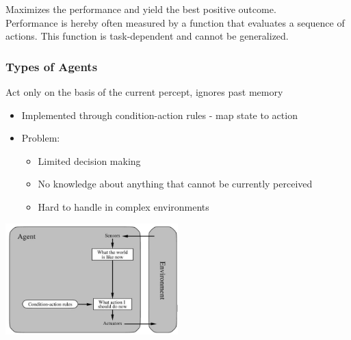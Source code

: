 \documentclass[
../../EiKI_Summary.tex,
]
{subfiles}
\begin{document}
\begin{defbox}
    Maximizes the performance and yield the best positive outcome. \\
    Performance is hereby often measured by a function that evaluates a sequence of actions. This function is task-dependent and cannot be generalized.
\end{defbox}

\subsubsection{Types of Agents}

\begin{defbox}
    Act only on the basis of the current percept, ignores past memory
    \begin{itemize}
        \item Implemented through condition-action rules - map state to action
        \item Problem:
        \begin{itemize}
            \item Limited decision making
            \item No knowledge about anything that cannot be currently perceived
            \item Hard to handle in complex environments
        \end{itemize}
    \end{itemize}
    
    \begin{center}
        \includegraphics[width=0.5\textwidth]{Pics/02/ReflexAgent.png}
    \end{center}
\end{defbox}
\end{document}
